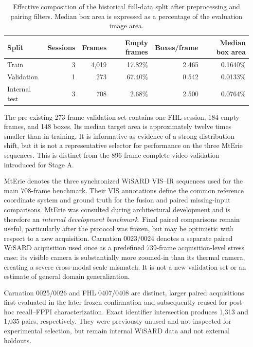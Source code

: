\begin{table}[htbp]
  \centering
  \caption{Effective composition of the historical full-data split after
  preprocessing and pairing filters. Median box area is expressed as a
  percentage of the evaluation image area.}
  \label{tab:dataset-splits}
  \begin{tabular}{lrrrrr}
    \toprule
    Split & Sessions & Frames & Empty frames & Boxes/frame & Median box area \\
    \midrule
    Train & 3 & 4,019 & 17.82\% & 2.465 & 0.1640\% \\
    Validation & 1 & 273 & 67.40\% & 0.542 & 0.0133\% \\
    Internal test & 3 & 708 & 2.68\% & 2.500 & 0.0764\% \\
    \bottomrule
  \end{tabular}
\end{table}

The pre-existing 273-frame validation set contains one FHL session, 184 empty
frames, and 148 boxes. Its median target area is approximately twelve times
smaller than in training. It is informative as evidence of a strong
distribution shift, but it is not a representative selector for performance on
the three MtErie sequences. This is distinct from the 896-frame complete-video
validation introduced for Stage A.

MtErie denotes the three synchronized WiSARD VIS--IR sequences used for the
main 708-frame benchmark. Their VIS annotations define the common reference
coordinate system and ground truth for the fusion and paired missing-input
comparisons. MtErie was consulted during architectural development and is
therefore an \emph{internal
development benchmark}. Final paired comparisons remain useful, particularly
after the protocol was frozen, but may be optimistic with respect to a new acquisition.
Carnation 0023/0024 denotes a separate paired WiSARD acquisition used once as a predefined
739-frame acquisition-level stress case: its visible camera is substantially more zoomed-in
than its thermal camera, creating a severe cross-modal scale mismatch. It is not a new
validation set or an estimate of general domain generalization.

Carnation 0025/0026 and FHL 0407/0408 are distinct, larger paired acquisitions
first evaluated in the later frozen confirmation and subsequently reused for
post-hoc recall--FPPI characterization. Exact identifier intersection
produces 1,313 and 1,035 pairs, respectively. They were previously unused and
not inspected for experimental selection, but remain internal WiSARD data and
not external holdouts.

